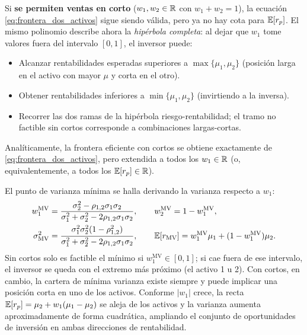 Si \textbf{se permiten ventas en corto} ($w_1,w_2 \in \mathbb{R}$ con $w_1+w_2=1$), la ecuación \eqref{eq:frontera_dos_activos} sigue siendo válida, pero ya no hay cota para $\mathbb{E}[r_p]$. El mismo polinomio describe ahora la \emph{hipérbola completa}: al dejar que $w_1$ tome valores fuera del intervalo $[0,1]$, el inversor puede:
\begin{itemize}
  \item Alcanzar rentabilidades esperadas superiores a $\max\{\mu_1,\mu_2\}$ (posición larga en el activo con mayor $\mu$ y corta en el otro).
  \item Obtener rentabilidades inferiores a $\min\{\mu_1,\mu_2\}$ (invirtiendo a la inversa).
  \item Recorrer las dos ramas de la hipérbola riesgo-rentabilidad; el tramo no factible sin cortos corresponde a combinaciones largas-cortas.
\end{itemize}
Analíticamente, la frontera eficiente con cortos se obtiene exactamente de \eqref{eq:frontera_dos_activos}, pero extendida a todos los $w_1 \in \mathbb{R}$ (o, equivalentemente, a todos los $\mathbb{E}[r_p] \in \mathbb{R}$).

El punto de varianza mínima se halla derivando la varianza respecto a $w_1$:
\begin{align*}
  w_1^{\text{MV}} &= \frac{\sigma_2^2 - \rho_{1,2}\sigma_1\sigma_2}{\sigma_1^2 + \sigma_2^2 - 2\rho_{1,2}\sigma_1\sigma_2}, \qquad
  w_2^{\text{MV}} = 1 - w_1^{\text{MV}},\\
  \sigma_{\text{MV}}^2 &= \frac{\sigma_1^2\sigma_2^2(1-\rho_{1,2}^2)}{\sigma_1^2 + \sigma_2^2 - 2\rho_{1,2}\sigma_1\sigma_2}, \qquad
  \mathbb{E}[r_{\text{MV}}] = w_1^{\text{MV}}\mu_1 + (1-w_1^{\text{MV}})\mu_2.
\end{align*}
Sin cortos solo es factible el mínimo si $w_1^{\text{MV}} \in [0,1]$; si cae fuera de ese intervalo, el inversor se queda con el extremo más próximo (el activo 1 u 2). Con cortos, en cambio, la cartera de mínima varianza existe siempre y puede implicar una posición corta en uno de los activos. Conforme $|w_1|$ crece, la recta $\mathbb{E}[r_p]=\mu_2 + w_1(\mu_1-\mu_2)$ se aleja de los activos y la varianza aumenta aproximadamente de forma cuadrática, ampliando el conjunto de oportunidades de inversión en ambas direcciones de rentabilidad.

